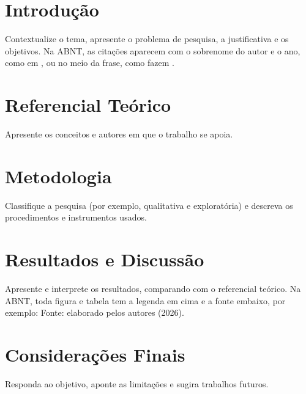 \documentclass[12pt,a4paper]{article}
\title{$titulo}
\author{$autor \\ Nome da instituição}
\date{}
\begin{document}
\maketitle

\begin{abstract}
Entre 100 e 250 palavras, em um parágrafo só: objetivo, método, resultados e conclusões. Logo abaixo, de três a cinco palavras-chave.

\textbf{Palavras-chave}: primeira; segunda; terceira.
\end{abstract}

\section{Introdução}

Contextualize o tema, apresente o problema de pesquisa, a justificativa e os objetivos. Na ABNT, as citações aparecem com o sobrenome do autor e o ano, como em \cite{barbosa2010ihc}, ou no meio da frase, como fazem .

\section{Referencial Teórico}

Apresente os conceitos e autores em que o trabalho se apoia.

\section{Metodologia}

Classifique a pesquisa (por exemplo, qualitativa e exploratória) e descreva os procedimentos e instrumentos usados.

\section{Resultados e Discussão}

Apresente e interprete os resultados, comparando com o referencial teórico. Na ABNT, toda figura e tabela tem a legenda em cima e a fonte embaixo, por exemplo: Fonte: elaborado pelos autores (2026).

\section{Considerações Finais}

Responda ao objetivo, aponte as limitações e sugira trabalhos futuros.



\end{document}
